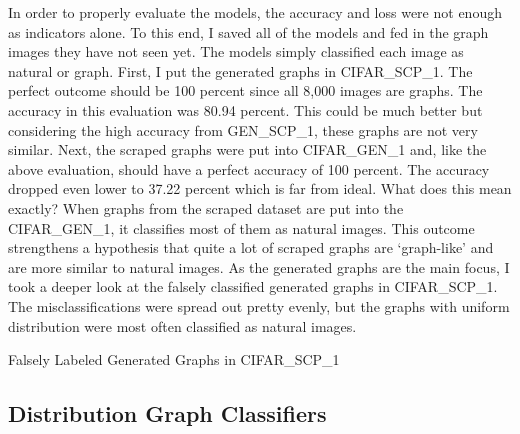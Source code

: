 \documentclass[12pt]{article}
\begin{document}
            In order to properly evaluate the models, the accuracy and loss were not enough as indicators alone. 
            To this end, I saved all of the models and fed in the graph images they have not seen yet. 
            The models simply classified each image as natural or graph. First, I put the generated graphs in CIFAR\_SCP\_1. 
            The perfect outcome should be 100 percent since all 8,000 images are graphs. 
            The accuracy in this evaluation was 80.94 percent. 
            This could be much better but considering the high accuracy from GEN\_SCP\_1, 
            these graphs are not very similar. Next, the scraped graphs were put into CIFAR\_GEN\_1 
            and, like the above evaluation, should have a perfect accuracy of 100 percent. 
            The accuracy dropped even lower to 37.22 percent which is far from ideal. 
            What does this mean exactly? When graphs from the scraped dataset are put into the CIFAR\_GEN\_1, 
            it classifies most of them as natural images. 
            This outcome strengthens a hypothesis that quite a lot of scraped graphs are ‘graph-like’ 
            and are more similar to natural images. As the generated graphs are the main focus, 
            I took a deeper look at the falsely classified generated graphs in CIFAR\_SCP\_1. 
            The misclassifications were spread out pretty evenly, 
            but the graphs with uniform distribution were most often classified as natural images.
            
            Falsely Labeled Generated Graphs in CIFAR\_SCP\_1

        \subsection{Distribution Graph Classifiers}
\end{document}
